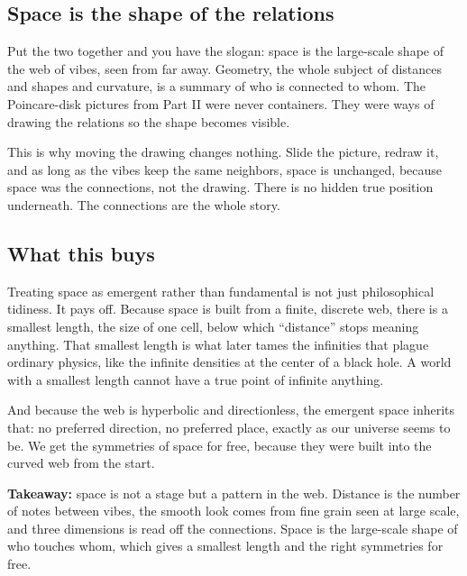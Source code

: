 \subsection{Space is the shape of the relations}

Put the two together and you have the slogan: space is the large-scale shape of the web of vibes, seen from far away. Geometry, the whole subject of distances and shapes and curvature, is a summary of who is connected to whom. The Poincare-disk pictures from Part II were never containers. They were ways of drawing the relations so the shape becomes visible.

This is why moving the drawing changes nothing. Slide the picture, redraw it, and as long as the vibes keep the same neighbors, space is unchanged, because space was the connections, not the drawing. There is no hidden true position underneath. The connections are the whole story.

\subsection{What this buys}

Treating space as emergent rather than fundamental is not just philosophical tidiness. It pays off. Because space is built from a finite, discrete web, there is a smallest length, the size of one cell, below which ``distance'' stops meaning anything. That smallest length is what later tames the infinities that plague ordinary physics, like the infinite densities at the center of a black hole. A world with a smallest length cannot have a true point of infinite anything.

And because the web is hyperbolic and directionless, the emergent space inherits that: no preferred direction, no preferred place, exactly as our universe seems to be. We get the symmetries of space for free, because they were built into the curved web from the start.

\textbf{Takeaway:} space is not a stage but a pattern in the web. Distance is the number of notes between vibes, the smooth look comes from fine grain seen at large scale, and three dimensions is read off the connections. Space is the large-scale shape of who touches whom, which gives a smallest length and the right symmetries for free.
